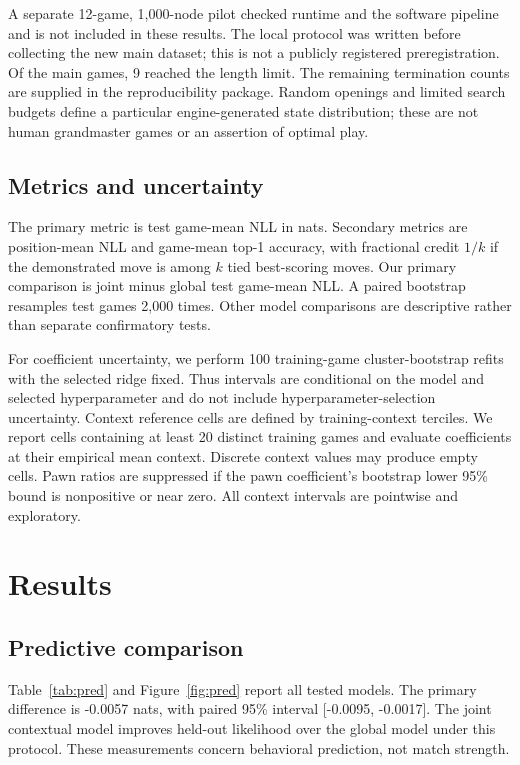 \documentclass[11pt]{article}
\begin{document}
A separate 12-game, 1,000-node pilot checked runtime and the software pipeline and is not included in these results. The local protocol was written before collecting the new main dataset; this is not a publicly registered preregistration. Of the main games, 9 reached the length limit. The remaining termination counts are supplied in the reproducibility package. Random openings and limited search budgets define a particular engine-generated state distribution; these are not human grandmaster games or an assertion of optimal play.

\subsection{Metrics and uncertainty}
The primary metric is test game-mean NLL in nats. Secondary metrics are position-mean NLL and game-mean top-1 accuracy, with fractional credit $1/k$ if the demonstrated move is among $k$ tied best-scoring moves. Our primary comparison is joint minus global test game-mean NLL. A paired bootstrap resamples test games 2,000 times. Other model comparisons are descriptive rather than separate confirmatory tests.

For coefficient uncertainty, we perform 100 training-game cluster-bootstrap refits with the selected ridge fixed. Thus intervals are conditional on the model and selected hyperparameter and do not include hyperparameter-selection uncertainty. Context reference cells are defined by training-context terciles. We report cells containing at least 20 distinct training games and evaluate coefficients at their empirical mean context. Discrete context values may produce empty cells. Pawn ratios are suppressed if the pawn coefficient's bootstrap lower 95\% bound is nonpositive or near zero. All context intervals are pointwise and exploratory.

\section{Results}
\subsection{Predictive comparison}
Table~\ref{tab:pred} and Figure~\ref{fig:pred} report all tested models. The primary difference is -0.0057 nats, with paired 95\% interval [-0.0095, -0.0017]. The joint contextual model improves held-out likelihood over the global model under this protocol. These measurements concern behavioral prediction, not match strength.
\end{document}
